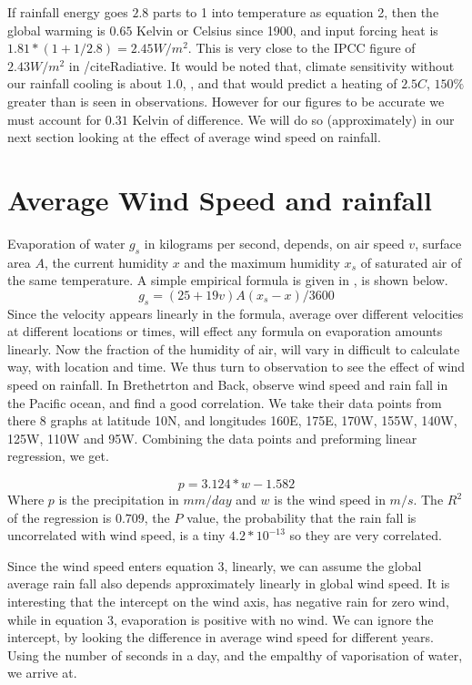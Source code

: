 \documentclass{book}
\begin{document}
   If rainfall energy goes $2.8$ parts to 1 into temperature as equation 2, then the global warming is $0.65$  Kelvin or Celsius since 1900, and input forcing heat is $1.81*(1+1/2.8)= 2.45 W/m^2$. This is very close to the IPCC figure of $2.43 W/m^2$ in /cite{Radiative}. It would be noted that, climate sensitivity without our rainfall cooling is about $1.0$, \cite{wikisense}, and that would predict a heating of $2.5C$, $150\% $ greater than is seen in observations. However for our figures to be accurate we must account for $0.31$ Kelvin  of difference. We will do so (approximately) in our next section looking at the effect of average wind speed on rainfall.
   
   \section{Average Wind Speed and rainfall}
   
   	Evaporation of water $g_s$ in kilograms per second, depends, on air speed $v$, surface area $A$, the current humidity $x$ and the maximum humidity $x_s$ of saturated air of the same temperature. A simple empirical formula is given in \cite{EngTB1}, is shown below.
   \begin{equation}
   	g_s = (25 + 19v) A (x_s - x)/3600 
   \end{equation}
   Since the velocity appears linearly in the formula, average over different velocities at different locations or times, will effect any formula on evaporation amounts linearly. Now the fraction of the humidity of air, will vary in  difficult to calculate way, with location and time. We thus turn to observation to see the effect of wind speed on rainfall. In \cite{Bretherton} Brethetrton and Back, observe wind speed and rain fall in the Pacific ocean, and find a good correlation. We take their data points from there 8 graphs at latitude 10N, and longitudes 160E, 175E, 170W, 155W, 140W, 125W, 110W and 95W. Combining the data points and preforming
   linear regression, we get.
   
   \begin{equation}
    p = 3.124 * w - 1.582 
   	\end{equation}
   Where $p$ is the precipitation in $mm/day$ and $w$ is the wind speed in $m/s$. The $R^2$ of the regression is $0.709$, the $P$ value, the probability that the rain fall is uncorrelated with wind speed, is a tiny
   $4.2*10^{-13}$ so they are very correlated.
   
   Since the wind speed enters equation 3, linearly, we can assume the global average rain fall also depends approximately linearly in global wind speed. It is interesting that the intercept on the wind axis, has negative rain for zero wind, while in equation 3, evaporation is positive with no wind. We can ignore the intercept, by looking the difference in average wind speed for different years. Using the number of seconds in a day, and the empalthy of vaporisation of water, we arrive at.
   
\end{document}
